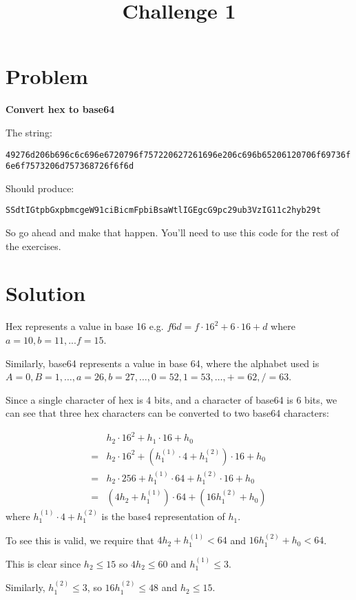 \documentclass[a4paper,10pt]{article}
\begin{document}
\title{Challenge 1}
\date{}

\maketitle

\section{Problem} %
\label{sec:problem}

{\bf Convert hex to base64}

The string:

\verb+49276d206b696c6c696e6720796f757220627261696e206c696b65206120706f69736f6e6f7573206d757368726f6f6d+

Should produce:

\verb+SSdtIGtpbGxpbmcgeW91ciBicmFpbiBsaWtlIGEgcG9pc29ub3VzIG11c2hyb29t+

So go ahead and make that happen. You'll need to use this code for the rest of the exercises. 

\section{Solution} %
\label{sec:solution}

Hex represents a value in base 16 e.g. $f6d = f\cdot16^2 + 6\cdot16 + d$
where $a=10, b=11, ... f=15$.

Similarly, base64 represents a value in base 64, where the alphabet used
is $A=0, B=1, \dots, a=26, b=27, \dots, 0=52, 1=53, \dots, + = 62, / = 63$.

Since a single character of hex is 4 bits, and a character of base64 is 6 bits, 
we can see that three hex characters can be converted to two base64 characters:

\begin{align*}
 &h_2 \cdot 16^2 + h_1 \cdot 16 + h_0 \\
= &h_2 \cdot 16^2 + (h_1^{(1)}\cdot 4 + h_1^{(2)})\cdot 16 + h_0 \\
= &h_2 \cdot 256 + h_1^{(1)} \cdot 64 + h_1^{(2)}\cdot 16 + h_0 \\
= &(4h_2 + h_1^{(1)})\cdot64 + (16 h_1^{(2)} + h_0)
\end{align*}
where $h_1^{(1)}\cdot 4 + h_1^{(2)}$ is the base4 representation of $h_1$.

To see this is valid, we require that $4h_2 + h_1^{(1)} < 64$ and 
$16 h_1^{(2)} + h_0 < 64$.

This is clear since $h_2 \leq 15$ so $4h_2 \leq 60$ and $ h_1^{(1)} \leq 3$.

Similarly, $h_1^{(2)} \leq 3$, so $16 h_1^{(2)} \leq 48$ and $h_2 \leq 15$.
\end{document}
